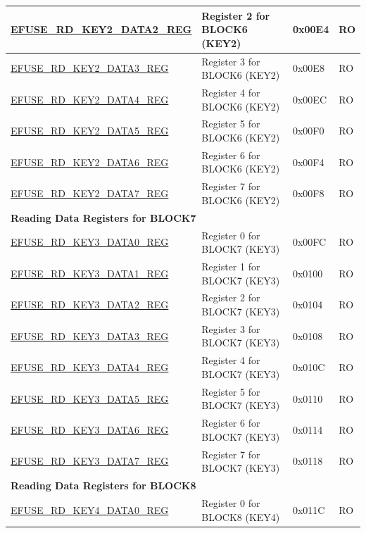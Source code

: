 \begin{longtable}{ | p{7cm} | p{7.2cm} | p{1.3cm} | p{1cm} | }
\hyperref[regdesc:EFUSERDKEY2DATANREG]{EFUSE\_RD\_KEY2\_DATA2\_REG} & Register 2 for BLOCK6 (KEY2) & 0x00E4 & RO \\ \hline
\hyperref[regdesc:EFUSERDKEY2DATANREG]{EFUSE\_RD\_KEY2\_DATA3\_REG} & Register 3 for BLOCK6 (KEY2) & 0x00E8 & RO \\ \hline
\hyperref[regdesc:EFUSERDKEY2DATANREG]{EFUSE\_RD\_KEY2\_DATA4\_REG} & Register 4 for BLOCK6 (KEY2) & 0x00EC & RO \\ \hline
\hyperref[regdesc:EFUSERDKEY2DATANREG]{EFUSE\_RD\_KEY2\_DATA5\_REG} & Register 5 for BLOCK6 (KEY2) & 0x00F0 & RO \\ \hline
\hyperref[regdesc:EFUSERDKEY2DATANREG]{EFUSE\_RD\_KEY2\_DATA6\_REG} & Register 6 for BLOCK6 (KEY2) & 0x00F4 & RO \\ \hline
\hyperref[regdesc:EFUSERDKEY2DATANREG]{EFUSE\_RD\_KEY2\_DATA7\_REG} & Register 7 for BLOCK6 (KEY2) & 0x00F8 & RO \\ \hline
\multicolumn{4}{|l|}{\textbf{Reading Data Registers for BLOCK7}} \\ \hline
\hyperref[regdesc:EFUSERDKEY3DATAMREG]{EFUSE\_RD\_KEY3\_DATA0\_REG} & Register 0 for BLOCK7 (KEY3) & 0x00FC & RO \\ \hline
\hyperref[regdesc:EFUSERDKEY3DATAMREG]{EFUSE\_RD\_KEY3\_DATA1\_REG} & Register 1 for BLOCK7 (KEY3) & 0x0100 & RO \\ \hline
\hyperref[regdesc:EFUSERDKEY3DATAMREG]{EFUSE\_RD\_KEY3\_DATA2\_REG} & Register 2 for BLOCK7 (KEY3) & 0x0104 & RO \\ \hline
\hyperref[regdesc:EFUSERDKEY3DATAMREG]{EFUSE\_RD\_KEY3\_DATA3\_REG} & Register 3 for BLOCK7 (KEY3) & 0x0108 & RO \\ \hline
\hyperref[regdesc:EFUSERDKEY3DATAMREG]{EFUSE\_RD\_KEY3\_DATA4\_REG} & Register 4 for BLOCK7 (KEY3) & 0x010C & RO \\ \hline
\hyperref[regdesc:EFUSERDKEY3DATAMREG]{EFUSE\_RD\_KEY3\_DATA5\_REG} & Register 5 for BLOCK7 (KEY3) & 0x0110 & RO \\ \hline
\hyperref[regdesc:EFUSERDKEY3DATAMREG]{EFUSE\_RD\_KEY3\_DATA6\_REG} & Register 6 for BLOCK7 (KEY3) & 0x0114 & RO \\ \hline
\hyperref[regdesc:EFUSERDKEY3DATAMREG]{EFUSE\_RD\_KEY3\_DATA7\_REG} & Register 7 for BLOCK7 (KEY3) & 0x0118 & RO \\ \hline
\multicolumn{4}{|l|}{\textbf{Reading Data Registers for BLOCK8}} \\ \hline
\hyperref[regdesc:EFUSERDKEY4DATANREG]{EFUSE\_RD\_KEY4\_DATA0\_REG} & Register 0 for BLOCK8 (KEY4) & 0x011C & RO \\ \hline

\end{longtable}
